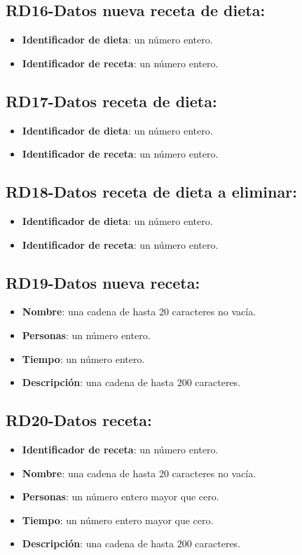 \documentclass[a4paper,12pt]{report}
\begin{document}
\subsection{RD16-Datos nueva receta de dieta:}
\label{sec-2-1-16}
\begin{itemize}
\item \textbf{Identificador de dieta}: un número entero.
\item \textbf{Identificador de receta}: un número entero.
\end{itemize}
\subsection{RD17-Datos receta de dieta:}
\label{sec-2-1-17}
\begin{itemize}
\item \textbf{Identificador de dieta}: un número entero.
\item \textbf{Identificador de receta}: un número entero.
\end{itemize}
\subsection{RD18-Datos receta de dieta a eliminar:}
\label{sec-2-1-18}
\begin{itemize}
\item \textbf{Identificador de dieta}: un número entero.
\item \textbf{Identificador de receta}: un número entero.
\end{itemize}
\subsection{RD19-Datos nueva receta:}
\label{sec-2-1-19}
\begin{itemize}
\item \textbf{Nombre}: una cadena de hasta 20 caracteres no vacía.
\item \textbf{Personas}: un número entero.
\item \textbf{Tiempo}: un número entero.
\item \textbf{Descripción}: una cadena de hasta 200 caracteres.
\end{itemize}
\subsection{RD20-Datos receta:}
\label{sec-2-1-20}
\begin{itemize}
\item \textbf{Identificador de receta}: un número entero.
\item \textbf{Nombre}: una cadena de hasta 20 caracteres no vacía.
\item \textbf{Personas}: un número entero mayor que cero.
\item \textbf{Tiempo}: un número entero mayor que cero.
\item \textbf{Descripción}: una cadena de hasta 200 caracteres.
\end{itemize}
\end{document}
